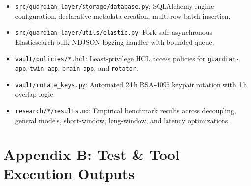 \documentclass[10pt,a4paper]{report}
\begin{document}
\begin{itemize}[leftmargin=*]
  \item \texttt{src/guardian\_layer/storage/database.py}: SQLAlchemy engine configuration, declarative metadata creation, multi-row batch insertion.
  \item \texttt{src/guardian\_layer/utils/elastic.py}: Fork-safe asynchronous Elasticsearch bulk NDJSON logging handler with bounded queue.
  \item \texttt{vault/policies/*.hcl}: Least-privilege HCL access policies for \texttt{guardian-app}, \texttt{twin-app}, \texttt{brain-app}, and \texttt{rotator}.
  \item \texttt{vault/rotate\_keys.py}: Automated 24\,h RSA-4096 keypair rotation with 1\,h overlap logic.
  \item \texttt{research/*/results.md}: Empirical benchmark results across decoupling, general models, short-window, long-window, and latency optimizations.
\end{itemize}

\section{Appendix B: Test \& Tool Execution Outputs}
\end{document}
